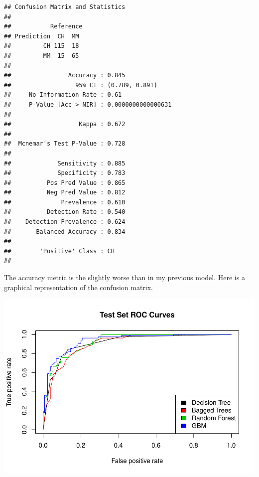 \documentclass[
]{book}
\newenvironment{Shaded}{\begin{snugshade}}{\end{snugshade}}
\newcommand{\DataTypeTok}[1]{\textcolor[rgb]{0.13,0.29,0.53}{#1}}
\newcommand{\DecValTok}[1]{\textcolor[rgb]{0.00,0.00,0.81}{#1}}
\newcommand{\KeywordTok}[1]{\textcolor[rgb]{0.13,0.29,0.53}{\textbf{#1}}}
\newcommand{\NormalTok}[1]{#1}
\newcommand{\OperatorTok}[1]{\textcolor[rgb]{0.81,0.36,0.00}{\textbf{#1}}}
\newcommand{\StringTok}[1]{\textcolor[rgb]{0.31,0.60,0.02}{#1}}
\begin{document}
\begin{verbatim}
## Confusion Matrix and Statistics
## 
##           Reference
## Prediction  CH  MM
##         CH 115  18
##         MM  15  65
##                                             
##                Accuracy : 0.845             
##                  95% CI : (0.789, 0.891)    
##     No Information Rate : 0.61              
##     P-Value [Acc > NIR] : 0.0000000000000631
##                                             
##                   Kappa : 0.672             
##                                             
##  Mcnemar's Test P-Value : 0.728             
##                                             
##             Sensitivity : 0.885             
##             Specificity : 0.783             
##          Pos Pred Value : 0.865             
##          Neg Pred Value : 0.812             
##              Prevalence : 0.610             
##          Detection Rate : 0.540             
##    Detection Prevalence : 0.624             
##       Balanced Accuracy : 0.834             
##                                             
##        'Positive' Class : CH                
## 
\end{verbatim}

The accuracy metric is the slightly worse than in my previous model. Here is a graphical representation of the confusion matrix.

\begin{Shaded}
\end{Shaded}

\includegraphics{data-sci_files/figure-latex/unnamed-chunk-90-1.pdf}
\end{document}
